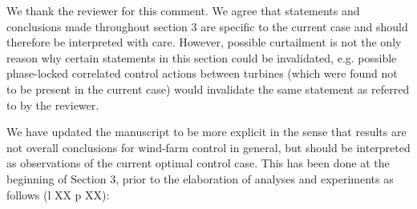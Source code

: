 \documentclass[]{article}
\begin{document}
%
%
%
%
%

We thank the reviewer for this comment. We agree that statements and conclusions made throughout section 3 are specific to the current case and should therefore be interpreted with care. However, possible curtailment is not the only reason why certain statements in this section could be invalidated, e.g. possible phase-locked correlated control actions between turbines (which were found not to be present in the current case) would invalidate the same statement as referred to by the reviewer.

We have updated the manuscript to be more explicit in the sense that results are not overall conclusions for wind-farm control in general, but should be interpreted as observations of the current optimal control case. This has been done at the beginning of Section 3, prior to the elaboration of analyses and experiments as follows (l XX p XX):
\end{document}
